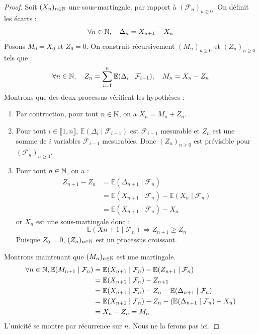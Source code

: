 \begin{proof}
    Soit $(X_n)_{n \in \mathbb{N}}$ une sous-martingale. par rapport à $( \mathcal{F}_n)_{n \geqslant 0}$. On définit les 
    écarts : 
        $$ \forall n \in \mathbb{N}, \quad \Delta_n = X_{n+1} - X_n $$ 
    Posons $ M_0 = X_0$ et $Z_0 = 0$. On construit récursivement $(M_n)_{n \geqslant 0}$ et $(Z_n)_{n \geqslant 0}$ tels 
    que :
        $$ \forall n \in \mathbb{N}, \quad Z_n = \sum_{i=1}^{n} \mathbb{E}( \Delta_i \mid \mathcal{F}_{i-1}), \quad M_n = X_n - Z_n $$
    Montrons que des deux processus vérifient les hypothèses : 
    \begin{enumerate}[label=\roman*)]
        \item Par contruction, pour tout $ n \in \mathbb{N}$, on a $X_n = M_n + Z_n$. 
        \item Pour tout $i \in \llbracket 1, n \rrbracket$, $ \mathbb{E}( \Delta_i \mid \mathcal{F}_{i-1})$ est $ \mathcal{F}_{i-1}$ 
            mesurable et $Z_n$ est une somme de $i$ variables $ \mathcal{F}_{i-1}$ mesurables. Donc $(Z_n)_{n \geqslant 0}$ est 
            prévisible pour $( \mathcal{F}_n)_{n \geqslant 0}$. 
        \item Pour tout $n \in \mathbb{N}$, on a : 
            \begin{align*}
                Z_{n+1} - Z_n &= \mathbb{E}( \Delta_{n+1} \mid \mathcal{F}_n) \\ 
                &= \mathbb{E}(X_{n+1} \mid \mathcal{F}_n) - \mathbb{E}(X_n \mid \mathcal{F}_n) \\ 
                &= \mathbb{E}(X_{n+1} \mid \mathcal{F}_n) - X_n 
            \end{align*}
        or $X_n$ est une sous-martingale donc : 
            $$ \mathbb{E}(X{n+1} \mid \mathcal{F}_n) \Longrightarrow Z_{n+1} \geqslant Z_n $$ 
        Puisque $Z_0 = 0$, $(Z_n)_{n \in \mathbb{N}}$ est un processus croissant. 
    \end{enumerate}
    Montrons maintenant que $(M_n)_{n \in \mathbb{N}}$ est une martingale. 
    \begin{align*}
        \forall n \in \mathbb{N}, \mathbb{E}(M_{n+1} \mid \mathcal{F}_n) &= \mathbb{E}(X_{n+1} \mid \mathcal{F}_n) - \mathbb{E}(Z_{n+1} \mid \mathcal{F}_n) \\ 
        &= \mathbb{E}(X_{n+1} \mid \mathcal{F}_n) - Z_{n+1} \quad \\ 
        &= \mathbb{E}(X_{n+1} \mid \mathcal{F}_{n}) - Z_n - \mathbb{E}( \Delta_{n+1} \mid \mathcal{F}_n) \\ 
        &= \mathbb{E}(X_{n+1} \mid \mathcal{F}_{n}) - Z_n - (\mathbb{E}( \Delta_{n+1} \mid \mathcal{F}_n) - X_n) \\ 
        &= X_n - Z_n = M_n
    \end{align*}
    L'unicité se montre par récurrence sur $n$. Nous ne la ferons pas ici.
\end{proof}


